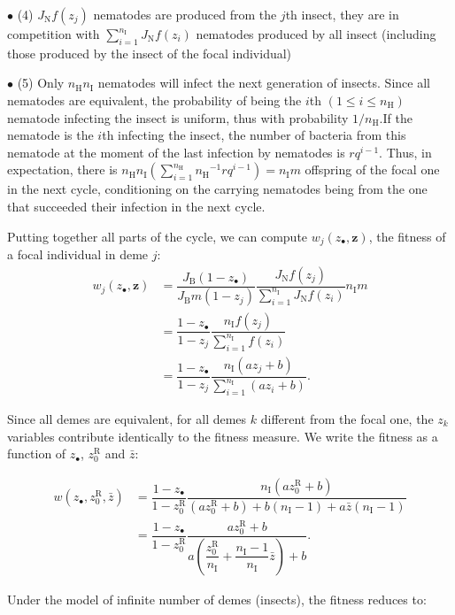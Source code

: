 \documentclass{article}
\newcommand{\nN}{{n_\textrm{H}}}
\newcommand{\nI}{{n_\textrm{I}}}
\begin{document}
 
 $\bullet$ (4) $J_{\mathrm{N}} f(z_j)$ nematodes are produced from the $j$th insect, they are in competition with $\sum_{i=1}^{\nI} J_\mathrm{N} f(z_i)$ nematodes produced by all insect (including those produced by the insect of the focal individual)
 
 
 $\bullet$ (5) Only $\nN \nI$ nematodes will infect the next generation of insects. Since all nematodes are equivalent, the probability of being the $i$th $(1 \leq i \leq \nN)$ nematode infecting the insect 
is uniform, thus with probability $1/\nN$.If the nematode is the $i$th infecting the insect, the number of bacteria from this nematode at the moment of the last infection by nematodes is $r q^{i-1}$.
Thus, in expectation, there is $\nN \nI (\sum_{i=1}^\nN \nN^{-1}  r q^{i-1})=\nI m$ offspring of the focal one in the next cycle, conditioning on the carrying nematodes being from the one that succeeded their infection in the next cycle. 


Putting together all parts of the cycle, we can compute $ w_j(z_\bullet , \mathbf{z} )$, the fitness of a focal individual in deme $j$:
 \begin{align}
 w_j(z_\bullet , \mathbf{z} ) &= \dfrac{J_{\mathrm{B}}(1-z_\bullet)}{J_{\mathrm{B}} m (1- z_j)}\dfrac{ J_\mathrm{N} f(z_j)}{\sum_{i=1}^{\nI} J_\mathrm{N}  f(z_i)} \nI m \\
 &= \dfrac{1-z_\bullet}{1- z_j}\dfrac{\nI f(z_j)}{\sum_{i=1}^{\nI} f(z_i)} \\
  &= \dfrac{1-z_\bullet}{1- z_j}\dfrac{\nI (a z_j +b) }{\sum_{i=1}^{\nI} (a z_i +b)}.
 \end{align}
 
 Since all demes are equivalent, for all demes $k$ different from the focal one, the $z_k$ variables contribute identically to the fitness measure. We write the fitness as a function of $z_\bullet$, $z_0^{\mathrm{R}}$ and $\bar{z}$:
 
  \begin{align}
 w(z_\bullet ,z_0^{\mathrm{R}} , \bar{z} ) &= \dfrac{1-z_\bullet}{1- z_0^{\mathrm{R}}}\dfrac{\nI (a z_0^{\mathrm{R}} +b) }{(a z_0^{\mathrm{R}} +b)+ b(\nI -1) +a \bar{z} (\nI-1)} \\
 &= \dfrac{1-z_\bullet}{1- z_0^{\mathrm{R}}}\dfrac{ a z_0^{\mathrm{R}} +b }{a \left( \dfrac{z_0^{\mathrm{R}}}{\nI} +\dfrac{\nI-1}{\nI} \bar{z} \right) +b}.
  \end{align}
  
  Under the model of infinite number of demes (insects), the fitness reduces to:
  
\end{document}
